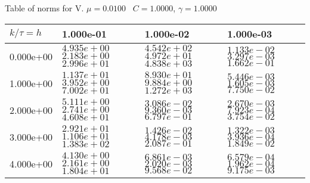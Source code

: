 \begin{center}
Table of norms for V. $\mu = 0.0100$ \, $C = 1.0000$, $\gamma = 1.0000$
  
\begin{tabular}{|p{1in}|p{1in}|p{1in}|p{1in}|} \hline
$k / \tau = h$ &1.000e-01 &1.000e-02 &1.000e-03 \\ \hline 
0.000e+00 & $4.935e+00$  $2.183e+00$  $2.996e+01$  & $4.542e+02$  $4.972e+01$  $4.838e+03$  & $1.133e-02$  $3.297e-03$  $1.662e-01$  \\ \hline 
1.000e+00 & $1.137e+01$  $3.952e+00$  $7.002e+01$  & $8.930e+01$  $9.884e+00$  $1.272e+03$  & $5.446e-03$  $1.605e-03$  $7.750e-02$  \\ \hline 
2.000e+00 & $5.111e+00$  $2.741e+00$  $4.608e+01$  & $3.086e-02$  $9.360e-03$  $6.797e-01$  & $2.670e-03$  $7.923e-04$  $3.754e-02$  \\ \hline 
3.000e+00 & $2.921e+01$  $1.106e+01$  $1.383e+02$  & $1.426e-02$  $4.178e-03$  $2.087e-01$  & $1.322e-03$  $3.936e-04$  $1.849e-02$  \\ \hline 
4.000e+00 & $4.130e+00$  $2.161e+00$  $1.804e+01$  & $6.861e-03$  $2.020e-03$  $9.568e-02$  & $6.579e-04$  $1.962e-04$  $9.175e-03$  \\ \hline 

\end{tabular}\\[20pt]
\end{center}
